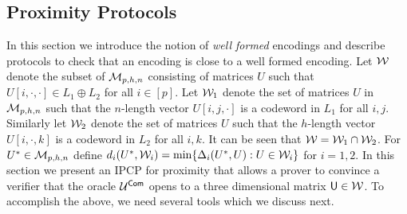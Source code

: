 \subsection{Proximity Protocols}\label{sec:proximityprotocols}
In this section we introduce the notion of {\em well formed} encodings and
describe protocols to check that an encoding is close to a well formed encoding.
Let $\mathcal{W}$ denote the subset of $\mathcal{M}_{p,h,n}$
consisting of matrices $U$ such that $U[i,\cdot,\cdot]\in L_1\oplus L_2$ for all $i\in [p]$. 
Let $\mathcal{W}_1$ denote the set of matrices
$U$ in $\mathcal{M}_{p,h,n}$ such that the $n$-length vector $U[i,j,\cdot]$ is a
codeword in $L_1$ for all $i,j$. Similarly let $\mathcal{W}_2$ denote the set of
matrices $U$ such that the $h$-length vector $U[i,\cdot,k]$ is a codeword in
$L_2$ for all $i,k$. It can be seen that $\mathcal{W}=\mathcal{W}_1\cap \mathcal{W}_2$. For $U^\ast\in \mathcal{M}_{p,h,n}$ define
$d_i(U^\ast,\mathcal{W}_i)=\min\{\Delta_i(U^\ast,U):U\in \mathcal{W}_i\}$ for $i=1,2$.
In this section we present an IPCP for proximity that allows a prover to convince a verifier that
the oracle $\mathcal{U}^{\mathsf{Com}}$ opens to a three dimensional matrix $\mathsf{U}\in \mathcal{W}$. To accomplish the above, we need several tools which we discuss next.
 
